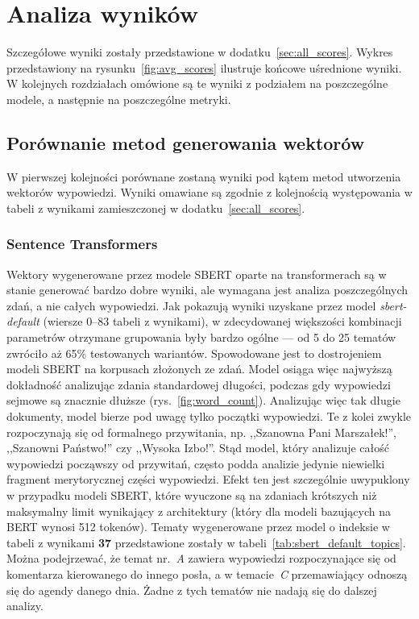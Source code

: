 
\chapter{Analiza wyników}
	Szczegółowe wyniki zostały przedstawione w dodatku~\ref{sec:all_scores}.
	Wykres przedstawiony na rysunku~\ref{fig:avg_scores} ilustruje końcowe uśrednione wyniki.
	W kolejnych rozdziałach omówione są te wyniki z podziałem na poszczególne modele,
		a następnie na poszczególne metryki.

\section{Porównanie metod generowania wektorów}
	W pierwszej kolejności porównane zostaną wyniki pod kątem metod utworzenia wektorów wypowiedzi.
	Wyniki omawiane są zgodnie z kolejnością występowania w tabeli z wynikami zamieszczonej w dodatku~\ref{sec:all_scores}.

	\subsection{Sentence Transformers}\label{sec:sbert_summary}
		Wektory wygenerowane przez modele SBERT oparte na transformerach są w stanie generować bardzo dobre wyniki,
			ale wymagana jest analiza poszczególnych zdań, a nie całych wypowiedzi.
		Jak pokazują wyniki uzyskane przez model \emph{sbert-default} (wiersze 0--83 tabeli z wynikami),
			w zdecydowanej większości kombinacji parametrów otrzymane grupowania były bardzo ogólne --- od 5 do 25 tematów zwróciło aż 65\% testowanych wariantów.
		Spowodowane jest to dostrojeniem modeli SBERT na korpusach złożonych ze zdań.
		Model osiąga więc najwyższą dokładność analizując zdania standardowej długości, podczas gdy wypowiedzi sejmowe są znacznie dłuższe (rys.~\ref{fig:word_count}).
		Analizując więc tak długie dokumenty, model bierze pod uwagę tylko początki wypowiedzi.
		Te z kolei zwykle rozpoczynają się od formalnego przywitania, np. ,,Szanowna Pani Marszałek!'', ,,Szanowni Państwo!'' czy ,,Wysoka Izbo!''.
		Stąd model, który analizuje całość wypowiedzi począwszy od przywitań, często podda analizie jedynie niewielki fragment merytorycznej części wypowiedzi.
		Efekt ten jest szczególnie uwypuklony w przypadku modeli SBERT, które wyuczone są na zdaniach krótszych niż maksymalny limit wynikający z architektury
			(który dla modeli bazujących na BERT wynosi 512 tokenów).
		Tematy wygenerowane przez model o indeksie w tabeli z wynikami \textbf{37} przedstawione zostały w tabeli~\ref{tab:sbert_default_topics}.
		Można podejrzewać, że temat nr.~\emph{A} zawiera wypowiedzi rozpoczynające się od komentarza kierowanego do innego posła, a w temacie~\emph{C} przemawiający odnoszą się do agendy danego dnia.
		Żadne z tych tematów nie nadają się do dalszej analizy.

